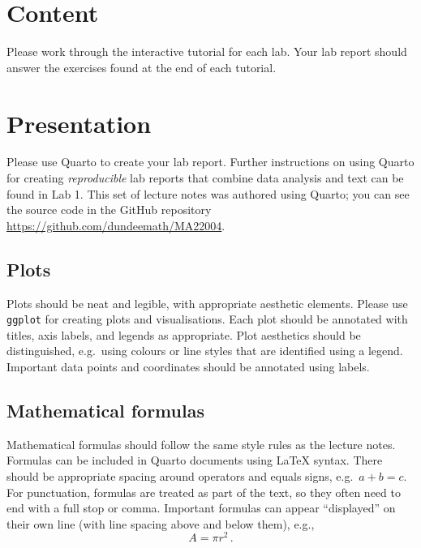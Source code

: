 \documentclass[
  a4paper,
  DIV=11,
  numbers=noendperiod,
  oneside]{scrreprt}
\theoremstyle{plain}
\theoremstyle{definition}
\theoremstyle{definition}
\theoremstyle{definition}
\theoremstyle{plain}
\theoremstyle{remark}
\begin{document}
\section*{Content}\label{w-content}


Please work through the interactive tutorial for each lab. Your lab
report should answer the exercises found at the end of each tutorial.

\section*{Presentation}\label{w-present}


Please use Quarto to create your lab report. Further instructions on
using Quarto for creating \emph{reproducible} lab reports that combine
data analysis and text can be found in Lab 1. This set of lecture notes
was authored using Quarto; you can see the source code in the GitHub
repository \url{https://github.com/dundeemath/MA22004}.

\subsection*{Plots}\label{w-plots}

Plots should be neat and legible, with appropriate aesthetic elements.
Please use \texttt{ggplot} for creating plots and visualisations. Each
plot should be annotated with titles, axis labels, and legends as
appropriate. Plot aesthetics should be distinguished, e.g.~using colours
or line styles that are identified using a legend. Important data points
and coordinates should be annotated using labels.

\subsection*{Mathematical formulas}\label{w-math}

Mathematical formulas should follow the same style rules as the lecture
notes. Formulas can be included in Quarto documents using {\LaTeX}
syntax. There should be appropriate spacing around operators and equals
signs, e.g.~\(a + b = c\). For punctuation, formulas are treated as part
of the text, so they often need to end with a full stop or comma.
Important formulas can appear ``displayed'' on their own line (with line
spacing above and below them), e.g., \[A=πr^2\,.\]
\end{document}
